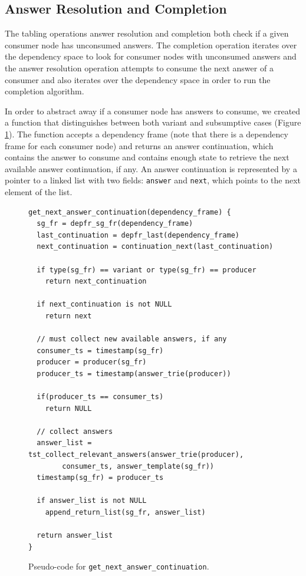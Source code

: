 \subsection{Answer Resolution and Completion}

The tabling operations answer resolution and completion both check if a
given consumer node has unconsumed answers. The completion operation
iterates over the dependency space to look for consumer nodes with unconsumed
answers and the answer resolution operation attempts to consume the next answer
of a consumer and also iterates over the dependency space in order to run the completion algorithm.

In order to abstract away if a consumer node has answers to consume,
we created a function that distinguishes between both variant and subsumptive cases
(Figure \ref{fig:get_next_answer_continuation}).
The function accepts a dependency frame (note that there is a dependency frame for
each consumer node) and returns an answer continuation, which contains the answer
to consume and contains enough state to retrieve the next available answer continuation, if any.
An answer continuation is represented by a pointer to a linked list with two fields:
\texttt{answer} and \texttt{next}, which points to the next element of the list.

\begin{figure}[ht]
\begin{Verbatim}
get_next_answer_continuation(dependency_frame) {
  sg_fr = depfr_sg_fr(dependency_frame)
  last_continuation = depfr_last(dependency_frame)
  next_continuation = continuation_next(last_continuation)
  
  if type(sg_fr) == variant or type(sg_fr) == producer
    return next_continuation
  
  if next_continuation is not NULL
    return next
  
  // must collect new available answers, if any
  consumer_ts = timestamp(sg_fr)
  producer = producer(sg_fr)
  producer_ts = timestamp(answer_trie(producer))
      
  if(producer_ts == consumer_ts)
    return NULL
        
  // collect answers
  answer_list = tst_collect_relevant_answers(answer_trie(producer),
        consumer_ts, answer_template(sg_fr))
  timestamp(sg_fr) = producer_ts
      
  if answer_list is not NULL
    append_return_list(sg_fr, answer_list)
      
  return answer_list
}
\end{Verbatim}
\caption{Pseudo-code for \texttt{get\_next\_answer\_continuation}.}
\label{fig:get_next_answer_continuation}
\end{figure}

